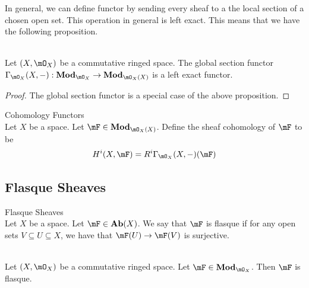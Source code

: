 \documentclass[a4paper]{article}
\begin{document}
In general, we can define functor by sending every sheaf to a the local section of a chosen open set. This operation in general is left exact. This means that we have the following proposition. 

\begin{crl}{}{}\\
Let $(X,\mO_X)$ be a commutative ringed space. The global section functor $\Gamma_{\mO_X}(X,-):\bold{Mod}_{\mO_X}\to\bold{Mod}_{\mO_X(X)}$ is a left exact functor. 
\begin{proof}
The global section functor is a special case of the above proposition. 
\end{proof}
\end{crl}

\begin{defn}{Cohomology Functors}{}\\
Let $X$ be a space. Let $\mF\in\bold{Mod}_{\mO_X(X)}$. Define the sheaf cohomology of $\mF$ to be $$H^i(X,\mF)=R^i\Gamma_{\mO_X}(X,-)(\mF)$$
\end{defn}

\subsection{Flasque Sheaves}
\begin{defn}{Flasque Sheaves}{}\\
Let $X$ be a space. Let $\mF\in\bold{Ab}(X)$. We say that $\mF$ is flasque if for any open sets $V\subseteq U\subseteq X$, we have that $\mF(U)\to\mF(V)$ is surjective. 
\end{defn}

\begin{lmm}{}{}\\
Let $(X,\mO_X)$ be a commutative ringed space. Let $\mF\in\bold{Mod}_{\mO_X}$. Then $\mF$ is flasque. 
\end{lmm}
\end{document}
